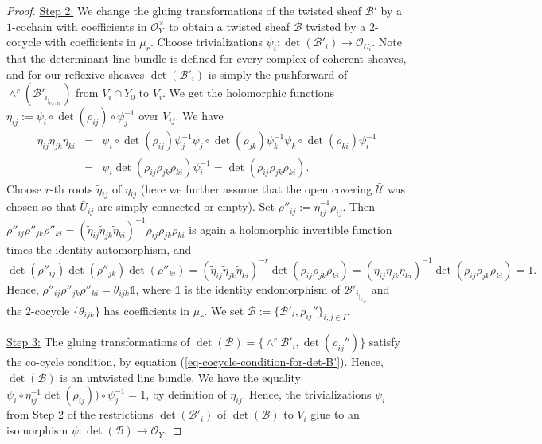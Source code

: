 \documentclass[12pt]{amsart}
\numberwithin{equation}{subsection}
\theoremstyle{plain}
\theoremstyle{definition}
\newcommand{\B}{{\mathcal B}}
\newcommand{\U}{{\mathcal U}}
\newcommand{\StructureSheaf}[1]{{\mathcal O}_{#1}}
\newcommand{\restricted}[2]{#1_{\mid_{#2}}}
\newcommand{\one}{{\mathbb 1}}
\begin{document}
\begin{proof}
\underline{Step 2:} We change the gluing transformations of the twisted sheaf $\B'$ by a $1$-cochain with coefficients in $\StructureSheaf{Y}^\times$ to obtain a twisted sheaf $\B$ twisted by a $2$-cocycle with coefficients in $\mu_r$. Choose trivializations $\psi_i:\det(\B'_i)\rightarrow \StructureSheaf{U_i}$.
Note that the determinant line bundle is defined for every complex of coherent sheaves, and for our reflexive sheaves $\det(\B'_i)$ is simply the pushforward of 
$\wedge^r(\B'_{\restricted{i}{V_i\cap Y_0}})$ from $V_i\cap Y_0$ to $V_i$. We get the holomorphic functions
$\eta_{ij}:=\psi_i\circ \det(\rho_{ij})\circ \psi_j^{-1}$ over $V_{ij}$. 
We have
\begin{eqnarray*}
\eta_{ij}\eta_{jk}\eta_{ki}&=&
\psi_i\circ \det(\rho_{ij})\psi_j^{-1}
\psi_j\circ \det(\rho_{jk})\psi_k^{-1}
\psi_k\circ \det(\rho_{ki})\psi_i^{-1}
\\
&=&\psi_i\det(\rho_{ij}\rho_{jk}\rho_{ki})\psi_i^{-1}=\det(\rho_{ij}\rho_{jk}\rho_{ki}).
\end{eqnarray*}
Choose $r$-th roots $\tilde{\eta}_{ij}$ of $\eta_{ij}$ (here we further assume that the open covering $\bar{\U}$ was chosen so that $\bar{U}_{ij}$ are simply connected or empty). Set $\rho''_{ij}:=\tilde{\eta}_{ij}^{-1}\rho_{ij}$. Then
$\rho''_{ij}\rho''_{jk}\rho''_{ki}=(\tilde{\eta}_{ij}\tilde{\eta}_{jk}\tilde{\eta}_{ki})^{-1}\rho_{ij}\rho_{jk}\rho_{ki}$ is again a holomorphic invertible function times the identity automorphism, and 
\begin{equation}
\label{eq-cocycle-condition-for-det-B'}
\det(\rho''_{ij})\det(\rho''_{jk})\det(\rho''_{ki})=(\tilde{\eta}_{ij}\tilde{\eta}_{jk}\tilde{\eta}_{ki})^{-r}\det(\rho_{ij}\rho_{jk}\rho_{ki})=
(\eta_{ij}\eta_{jk}\eta_{ki})^{-1}\det(\rho_{ij}\rho_{jk}\rho_{ki})
=1.
\end{equation}
Hence, $\rho''_{ij}\rho''_{jk}\rho''_{ki}=\theta_{ijk}\one$, where $\one$ is the identity endomorphism of $\B'_{\restricted{i}{V_{ijk}}}$ and 
the $2$-cocycle $\{\theta_{ijk}\}$ has coefficients in $\mu_r$. We set 
$\B:=\{\B'_i,\rho_{ij}''\}_{i,j\in I}$.


\underline{Step 3:} 
The gluing transformations of  $\det(\B)=\{\wedge^r\B'_i,\det(\rho_{ij}'')\}$ satisfy the co-cycle condition, by equation (\ref{eq-cocycle-condition-for-det-B'}).
Hence, $\det(\B)$ is an untwisted line bundle.
We have the equality 
$\psi_i\circ \eta_{ij}^{-1}\det(\rho_{ij}))\circ \psi_j^{-1}=1$, by definition of $\eta_{ij}$. Hence, the trivializations $\psi_i$ from Step 2 of the restrictions $\det(\B'_i)$ of $\det(\B)$ to $V_i$ glue to an isomorphism $\psi:\det(\B)\rightarrow \StructureSheaf{Y}$.
\end{proof}
\end{document}
